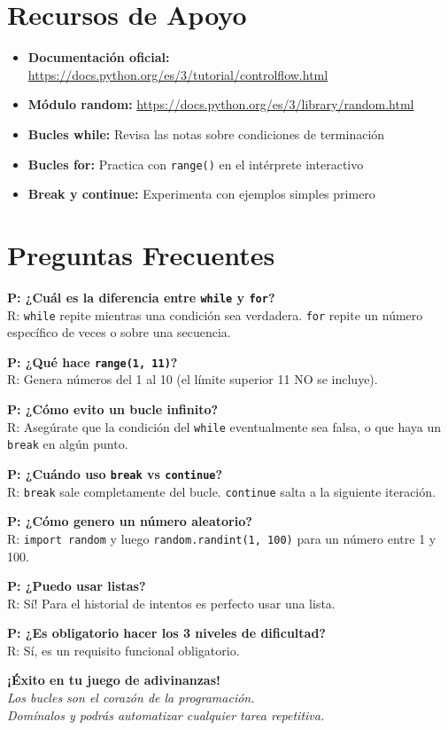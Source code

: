 \documentclass[12pt,a4paper]{article}
\begin{document}
\section{Recursos de Apoyo}

\begin{itemize}[leftmargin=*]
    \item \textbf{Documentación oficial:} \url{https://docs.python.org/es/3/tutorial/controlflow.html}
    \item \textbf{Módulo random:} \url{https://docs.python.org/es/3/library/random.html}
    \item \textbf{Bucles while:} Revisa las notas sobre condiciones de terminación
    \item \textbf{Bucles for:} Practica con \texttt{range()} en el intérprete interactivo
    \item \textbf{Break y continue:} Experimenta con ejemplos simples primero
\end{itemize}

\section{Preguntas Frecuentes}

\textbf{P: ¿Cuál es la diferencia entre \texttt{while} y \texttt{for}?}\\
R: \texttt{while} repite mientras una condición sea verdadera. \texttt{for} repite un número específico de veces o sobre una secuencia.

\textbf{P: ¿Qué hace \texttt{range(1, 11)}?}\\
R: Genera números del 1 al 10 (el límite superior 11 NO se incluye).

\textbf{P: ¿Cómo evito un bucle infinito?}\\
R: Asegúrate que la condición del \texttt{while} eventualmente sea falsa, o que haya un \texttt{break} en algún punto.

\textbf{P: ¿Cuándo uso \texttt{break} vs \texttt{continue}?}\\
R: \texttt{break} sale completamente del bucle. \texttt{continue} salta a la siguiente iteración.

\textbf{P: ¿Cómo genero un número aleatorio?}\\
R: \texttt{import random} y luego \texttt{random.randint(1, 100)} para un número entre 1 y 100.

\textbf{P: ¿Puedo usar listas?}\\
R: Sí! Para el historial de intentos es perfecto usar una lista.

\textbf{P: ¿Es obligatorio hacer los 3 niveles de dificultad?}\\
R: Sí, es un requisito funcional obligatorio.

\vspace{1cm}

\begin{center}
\textbf{¡Éxito en tu juego de adivinanzas!}\\
\textit{Los bucles son el corazón de la programación.\\
Domínalos y podrás automatizar cualquier tarea repetitiva.}
\end{center}
\end{document}
